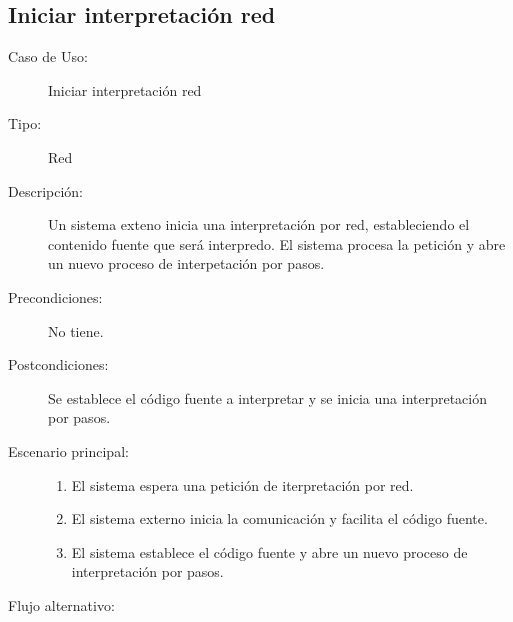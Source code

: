 \subsection{Iniciar interpretación red} 
\begin{framed}
\FloatBarrier
\begin{description}
   \item[Caso de Uso:]  Iniciar interpretación red 
   \item [Tipo:] Red
   \item[Descripción:] 
   Un sistema exteno inicia una interpretación por red, estableciendo el contenido fuente que será interpredo.
   El sistema procesa la petición y abre un nuevo proceso de interpetación por pasos.
   \item[Precondiciones:] 
   No tiene. 
   \item[Postcondiciones:] 
   Se establece el código fuente a interpretar y se inicia una interpretación por pasos.
   \item[Escenario principal:] \hfill
   \begin{enumerate}
   \item El sistema espera una petición de iterpretación por red.
   \item El sistema externo inicia la comunicación y facilita el código fuente.
   \item El sistema establece el código fuente y abre un nuevo proceso de interpretación por pasos. 
   \end{enumerate}
   \item[Flujo alternativo:] \hfill 
   \begin{enumerate} \itemsep1pt \parskip0pt 

\end{enumerate}
\end{description}
\end{framed}
